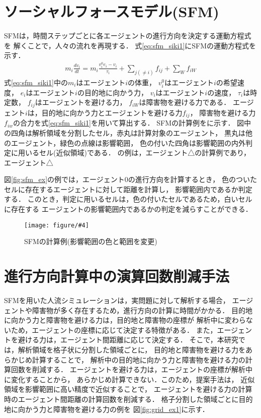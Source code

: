 \documentclass{maelab_y}
\newcommand{\figtb}[5]{ %
\begin{figure}[hbtp]
  \begin{center}
    \texttt{[image: figure/\#4]}
    \caption{#1}
    \label{fig:#5}
  \end{center}
\end{figure}
}%
\newcommand{\分類条件}{%
\begin{table}[t]
\begin{center}
\caption{進行方向を分類する条件}
\ecaption{Classification condition of moving direction $e_{i}$.}
\label{tb:hantei_jouken}
\begin{tabular}{c|c|c|c|c}
\hline \hline
			& 右 & 左 & 上 & 下 \\ \hline
パターン2   & $\frac{1}{\sqrt{2}} < e_x \leq 1  $
		    & $ -1 \leq e_x < \frac{-1}{\sqrt{2}}$ 
		    & $ \frac{-1}{\sqrt{2}} < e_x < \frac{1}{\sqrt{2}} $ 
		    & $ \frac{-1}{2} < e_x < \frac{1}{2} $ \\
パターン3   & $\frac{-1}{2} < e_y < \frac{1}{2} $ 
		    & $\frac{-1}{2} < e_y < \frac{1}{2} $
            & $ \frac{1}{\sqrt{2}} < e_y \leq 1$
		    & $ -1 \leq e_y < \frac{-1}{\sqrt{2}} $ \\
\hline
\multirow{2}{*}{パターン4}   
			& $R_x \geq A_x$ & $R_x < A_x$ & $R_y \geq A_y$ & $R_y < A_y $ \\
	        &  $L_x \geq A_x$ & $L_x < A_x$ & $L_y \geq A_y$ & $L_y < A_y$ \\
\hline
\multirow{2}{*}{パターン5}   
 			& $R_x \geq x_1$ & $R_x < x_2$ & $R_y \geq y_1$ & $R_y < y_2 $ \\
			& $L_x \geq x_1$ & $L_x < x_2$ & $L_y \geq y_1$ & $L_y < y_2 $ \\
\hline
パターン6   & $ \cos(\frac{1}{2}\theta_{view}) \leq  e_y $ 
			& $ e_y \leq -\cos(\frac{1}{2}\theta_{view})$ 
			& $ \sin(\frac{1}{2}(\pi - \theta_{view})) \leq e_x $ 
			& $ e_x \leq \sin(\frac{1}{2}(\pi - \theta_{view}))  $ \\
\hline
\end{tabular}
\end{center}
\end{table}}%
\newcommand{\距離計算new}{%
  \begin{table}[]
    \begin{center}
    \caption{エージェント間距離の計算回数[$10^{10}$回]}
    \label{tab:my-table}
    \begin{tabular}{c|llllll}
    \hline \hline
    \multirow{2}{*}{人数}   & \multicolumn{6}{c}{パターン}                                                                                                                                                             \\ \cline{2-7} 
                          & \multicolumn{1}{c|}{1}    & \multicolumn{1}{c|}{2}               & \multicolumn{1}{c|}{3}      & \multicolumn{1}{c|}{4}      & \multicolumn{1}{c|}{5}      & \multicolumn{1}{c}{6}    \\ \hline
    \multirow{2}{*}{3000} & \multicolumn{1}{r|}{5.1}  & \multicolumn{1}{r|}{\textbf{3.9}}    & \multicolumn{1}{r|}{4.0}    & \multicolumn{1}{r|}{4.4}    & \multicolumn{1}{r|}{4.1}    & \multicolumn{1}{r}{4.4}  \\
                          & \multicolumn{1}{l|}{}     & \multicolumn{1}{l|}{\textbf{(24\%)}} & \multicolumn{1}{l|}{(23\%)} & \multicolumn{1}{l|}{(15\%)} & \multicolumn{1}{l|}{(21\%)} & (15\%)                   \\ \hline
    \multirow{2}{*}{5000} & \multicolumn{1}{r|}{14.4} & \multicolumn{1}{r|}{\textbf{10.9}}   & \multicolumn{1}{r|}{11.1}   & \multicolumn{1}{r|}{12.2}   & \multicolumn{1}{r|}{11.4}   & \multicolumn{1}{r}{12.2} \\
                          & \multicolumn{1}{l|}{}     & \multicolumn{1}{l|}{\textbf{(24\%)}} & \multicolumn{1}{l|}{(23\%)} & \multicolumn{1}{l|}{(15\%)} & \multicolumn{1}{l|}{(21\%)} & (15\%)                   \\ \hline
    \multirow{2}{*}{7500} & \multicolumn{1}{r|}{33.1} & \multicolumn{1}{r|}{\textbf{25.2}}   & \multicolumn{1}{r|}{25.8}   & \multicolumn{1}{r|}{28.3}   & \multicolumn{1}{r|}{26.7}   & \multicolumn{1}{r}{28.3} \\
                          & \multicolumn{1}{l|}{}     & \multicolumn{1}{l|}{\textbf{(24\%)}} & \multicolumn{1}{l|}{(22\%)} & \multicolumn{1}{l|}{(15\%)} & \multicolumn{1}{l|}{(20\%)} & (15\%)                   \\ \hline
    \end{tabular}
    \end{center}
    \end{table}
}%
\newcommand{\粒子数}{%
\begin{table}[hbtp]
  \begin{center}
    \caption{各配置の詳細}
    \label{tb:haichi_para}
    \begin{tabular}{c|c|c}
      \hline \hline
      & 教室 & 演習室 \\ \hline 
      エージェント数[人] & 96 & 204 \\ \hline
      壁粒子数[個] & 1037 & 1454\\ \hline
      経由地数[個] & 12   & 26 \\ \hline
      解析領域 & $50m\times50m$ & $50m\times50m$ \\ \hline
    \end{tabular}
  \end{center}
\end{table}
}%
\newcommand{\評価環境}{%
\begin{table}[hbtp]
  \begin{center}
    \caption{各配置の詳細}
    \label{tb:haichi_para}
    \begin{tabular}{c|c|c}
      \hline \hline
                 & マシン1                & マシン2 \\ \hline 
      CPU        & Intel Xeon E5-2687W v2 & Intel Xeon E5-2667W v2 \\ \hline
      メモリ     & 64GB                   & 64GB \\ \hline
      OS         & Linux 4.12.9            & Linux 6.5.8 \\ \hline
      コンパイラ & gcc 7.2.0             & gcc 13.2.0 \\ \hline
    \end{tabular}
  \end{center}
\end{table}
}%
\begin{document}
\section{ソーシャルフォースモデル(SFM)}
SFMは，時間ステップごとに各エージェントの進行方向を決定する運動方程式を
解くことで，人々の流れを再現する．
式\eqref{eq:sfm_siki1}にSFMの運動方程式を示す．
%
\begin{align} \label{eq:sfm_siki1}
  m_i \frac{dv_i}{dt} = m_i \frac{v_i^0 e_i - v_i}{\tau_i}
  +\sum_{j(\neq i)}f_{ij}+\sum_{W}f_{iW}
\end{align}
%
式\eqref{eq:sfm_siki1}中の$m_i$はエージェント$i$の体重，
$v_i^0$はエージェント$i$の希望速度，
$e_i$はエージェント$i$の目的地に向かう力，
$v_i$はエージェント$i$の速度，
$\tau_i$は時定数，
$f_{ij}$はエージェントを避ける力，
$f_{iW}$は障害物を避ける力である．
エージェント$i$は，目的地に向かう力とエージェントを避ける力$f_{ij}$，
障害物を避ける力$f_{iw}$の合力を式\eqref{eq:sfm_siki1}を用いて算出する．
SFMの計算例をに示す．
図中の四角は解析領域を分割したセル，赤丸は計算対象のエージェント，
黒丸は他のエージェント，緑色の点線は影響範囲，
色の付いた四角は影響範囲の内外判定に用いるセル(近似領域)である．
の例は，エージェント△の計算例であり，
エージェント△

図\ref{fig:sfm_ex}の例では，エージェント0の進行方向を計算するとき，
色のついたセルに存在するエージェントに対して距離を計算し，
影響範囲内であるか判定する．
このとき，判定に用いるセルは，色の付いたセルであるため，白いセルに存在する
エージェントの影響範囲内であるかの判定を減らすことができる．

\figtb{SFMの計算例(影響範囲の色と範囲を変更)}{}{8}{20231226_sfm_ex.eps}{sougo_hani}

\section{進行方向計算中の演算回数削減手法}
SFMを用いた人流シミュレーションは，実問題に対して解析する場合，
エージェントや障害物が多く存在するため，進行方向の計算に時間がかかる．
目的地に向かう力と障害物を避ける力は，目的地と障害物の座標が
解析中に変わらないため，エージェントの座標に応じて決定する特徴がある．
また，エージェントを避ける力は，エージェント間距離に応じて決定する．
そこで，本研究では，解析領域を格子状に分割した領域ごとに，
目的地と障害物を避ける力をあらかじめ計算することで，
解析中の目的地に向かう力と障害物を避ける力の計算回数を削減する．
エージェントを避ける力は，エージェントの座標が解析中に変化することから，
あらかじめ計算できない．このため，提案手法は，
近似領域を影響範囲に高い精度で近似することで，
エージェントを避ける力の計算時のエージェント間距離の計算回数を削減する．
格子分割した領域ごとに目的地に向かう力と障害物を避ける力の例を
図\ref{fig:grid_ex1}に示す．
\end{document}
